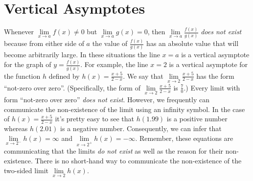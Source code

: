 \documentclass[10pt,oneside,]{book}
\theoremstyle{plain}
\theoremstyle{definition}
\numberwithin{equation}{section}
\newcommand{\fe}[2]{#1\mathopen{}\left(#2\right)\mathclose{}}
\begin{document}
\section[Vertical Asymptotes]{Vertical Asymptotes}\label{section-vertical-asymptotes}
Whenever \(\lim\limits_{x\to a}\fe{f}{x}\neq0\) but \(\lim\limits_{x\to a}\fe{g}{x}=0\), then \(\lim\limits_{x\to a}\frac{\fe{f}{x}}{\fe{g}{x}}\) \emph{does not exist} because from either side of \(a\) the value of \(\frac{\fe{f}{x}}{\fe{g}{x}}\) has an absolute value that will become arbitrarily large. In these situations the line \(x=a\) is a vertical asymptote for the graph of \(y=\frac{\fe{f}{x}}{\fe{g}{x}}\). For example, the line \(x=2\) is a vertical asymptote for the function \(h\) defined by \(\fe{h}{x}=\frac{x+5}{2-x}\). We say that \(\lim\limits_{x\to 2}\frac{x+5}{2-x}\) has the form ``not-zero over zero''. (Specifically, the form of \(\lim\limits_{x\to 2}\frac{x+5}{2-x}\) is \(\frac{7}{0}\).) Every limit with form ``not-zero over zero'' \emph{does not exist}. However, we frequently can communicate the non-existence of the limit using an infinity symbol. In the case of \(\fe{h}{x}=\frac{x+5}{2-x}\) it's pretty easy to see that \(\fe{h}{1.99}\) is a positive number whereas \(\fe{h}{2.01}\) is a negative number. Consequently, we can infer that \(\lim\limits_{x\to 2^{-}}\fe{h}{x}=\infty\) and \(\lim\limits_{x\to 2^{+}}\fe{h}{x}=-\infty\). Remember, these equations are communicating that the limits \emph{do not exist} as well as the reason for their non-existence. There is no short-hand way to communicate the non-existence of the two-sided limit \(\lim\limits_{x\to 2}\fe{h}{x}\).%
\typeout{************************************************}
\typeout{************************************************}
\end{document}
